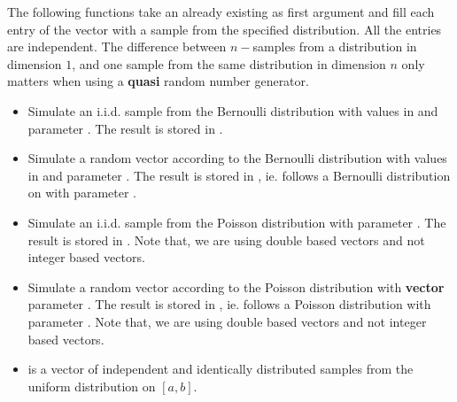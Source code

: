 The following functions take an already existing \PnlVect\ptr  as
first argument and fill each entry of the vector with a sample from the
specified distribution. All the entries are independent. The difference between
$n-$samples from a distribution in dimension $1$, and one sample from the same
distribution in dimension $n$ only matters when using a {\bf quasi} random
number generator.
\begin{itemize}
\item {}
  \sshortdescribe Simulate an i.i.d. sample from the Bernoulli
  distribution with values in  and parameter . The result is
  stored in .

\item {}
  \sshortdescribe Simulate a random vector according to the Bernoulli
  distribution with values in  and parameter . The result is
  stored in , ie.  follows a Bernoulli distribution on
   with parameter .

\item {}
  \sshortdescribe Simulate an i.i.d. sample from the Poisson distribution with
  parameter . The result is stored in . Note that, we are
  using double based vectors and not integer based vectors.

\item {}
  \sshortdescribe Simulate a random vector according to the Poisson distribution
  with \textbf{vector} parameter . The result is stored in ,
  ie.  follows a Poisson distribution with parameter .
  Note that, we are using double based vectors and not integer based vectors.
  
\item {}
  \sshortdescribe {} is a vector of independent and identically distributed
  samples from the uniform distribution on $[a, b]$.


\end{itemize}
